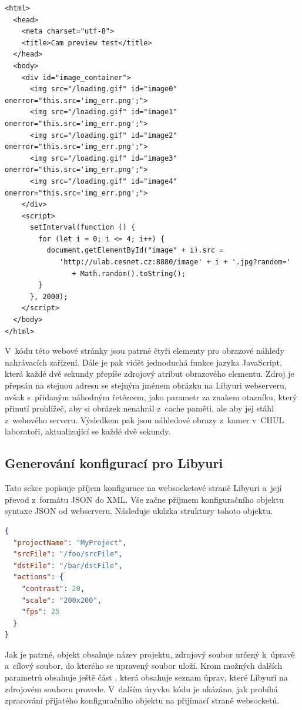 \documentclass[thesis=M,czech]{FITthesis}[2012/06/26]
\begin{document}
\begin{lstlisting}[style=htmlcssjs]
<html>
  <head>
    <meta charset="utf-8">
    <title>Cam preview test</title>
  </head>
  <body>
    <div id="image_container">
      <img src="/loading.gif" id="image0" onerror="this.src='img_err.png';">
      <img src="/loading.gif" id="image1" onerror="this.src='img_err.png';">
      <img src="/loading.gif" id="image2" onerror="this.src='img_err.png';">
      <img src="/loading.gif" id="image3" onerror="this.src='img_err.png';">
      <img src="/loading.gif" id="image4" onerror="this.src='img_err.png';">
    </div>
    <script>
      setInterval(function () {
        for (let i = 0; i <= 4; i++) {
          document.getElementById("image" + i).src = 
             'http://ulab.cesnet.cz:8880/image' + i + '.jpg?random='
                + Math.random().toString();
        }
      }, 2000);
    </script>
  </body>
</html>
\end{lstlisting}

V~kódu této webové stránky jsou patrné čtyři elementy  pro obrazové náhledy nahrávacích zařízení. Dále je pak vidět jednoduchá funkce jazyka JavaScript, která každé dvě sekundy přepíše zdrojový atribut obrazového elementu. Zdroj je přepsán na stejnou adresu se stejným jménem obrázku na Libyuri webserveru, avšak s~přidaným náhodným řetězcem, jako parametr za znakem otazníku, který přinutí prohlížeč, aby si obrázek nenahrál z~cache paměti, ale aby jej stáhl z~webového serveru. Výsledkem pak jsou náhledové obrazy z~kamer v~CHUL laboratoři, aktualizující se každé dvě sekundy.


\subsection{Generování konfigurací pro Libyuri} \label{subsec:impl_funkce_generate}
Tato sekce popisuje příjem konfigurace na websocketové straně Libyuri a~její převod z~formátu JSON do XML. Vše začne příjmem konfiguračního objektu syntaxe JSON od webserveru. Následuje ukázka struktury tohoto objektu.\\

\begin{lstlisting}[language=json]
{
  "projectName": "MyProject",
  "srcFile": "/foo/srcFile",
  "dstFile": "/bar/dstFile",
  "actions": {
    "contrast": 20,
    "scale": "200x200",
    "fps": 25
  }
}
\end{lstlisting}

Jak je patrné, objekt obsahuje název projektu, zdrojový soubor určený k~úpravě a~cílový soubor, do kterého se upravený soubor uloží. Krom možných dalších parametrů obsahuje ještě část , která obsahuje seznam úprav, které Libyuri na zdrojovém souboru provede. V~dalším úryvku kódu je ukázáno, jak probíhá zpracování přijatého konfiguračního objektu na přijímací straně websocketů.\\
\end{document}
